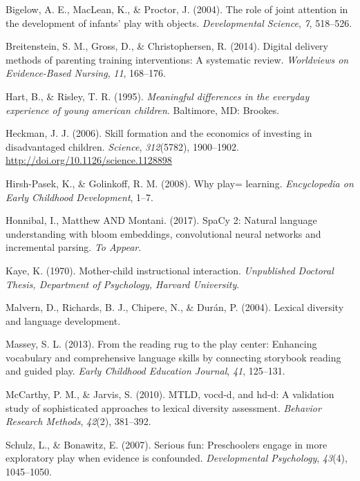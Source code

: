 \documentclass[10pt, letterpaper]{article}
\begin{document}
\hypertarget{ref-Bigelow2004}{}
Bigelow, A. E., MacLean, K., \& Proctor, J. (2004). The role of joint
attention in the development of infants' play with objects.
\emph{Developmental Science}, \emph{7}, 518--526.

\hypertarget{ref-Breitenstein2014}{}
Breitenstein, S. M., Gross, D., \& Christophersen, R. (2014). Digital
delivery methods of parenting training interventions: A systematic
review. \emph{Worldviews on Evidence-Based Nursing}, \emph{11},
168--176.

\hypertarget{ref-Hart1995}{}
Hart, B., \& Risley, T. R. (1995). \emph{Meaningful differences in the
everyday experience of young american children}. Baltimore, MD: Brookes.

\hypertarget{ref-Heckman2006}{}
Heckman, J. J. (2006). Skill formation and the economics of investing in
disadvantaged children. \emph{Science}, \emph{312}(5782), 1900--1902.
\url{http://doi.org/10.1126/science.1128898}

\hypertarget{ref-Hirsh2008}{}
Hirsh-Pasek, K., \& Golinkoff, R. M. (2008). Why play= learning.
\emph{Encyclopedia on Early Childhood Development}, 1--7.

\hypertarget{ref-spacy2}{}
Honnibal, I., Matthew AND Montani. (2017). SpaCy 2: Natural language
understanding with bloom embeddings, convolutional neural networks and
incremental parsing. \emph{To Appear}.

\hypertarget{ref-Kaye1970}{}
Kaye, K. (1970). Mother-child instructional interaction.
\emph{Unpublished Doctoral Thesis, Department of Psychology, Harvard
University}.

\hypertarget{ref-Malvern2004}{}
Malvern, D., Richards, B. J., Chipere, N., \& Durán, P. (2004). Lexical
diversity and language development.

\hypertarget{ref-Massey2013}{}
Massey, S. L. (2013). From the reading rug to the play center: Enhancing
vocabulary and comprehensive language skills by connecting storybook
reading and guided play. \emph{Early Childhood Education Journal},
\emph{41}, 125--131.

\hypertarget{ref-McCarthy2010}{}
McCarthy, P. M., \& Jarvis, S. (2010). MTLD, vocd-d, and hd-d: A
validation study of sophisticated approaches to lexical diversity
assessment. \emph{Behavior Research Methods}, \emph{42}(2), 381--392.

\hypertarget{ref-Schulz2007}{}
Schulz, L., \& Bonawitz, E. (2007). Serious fun: Preschoolers engage in
more exploratory play when evidence is confounded. \emph{Developmental
Psychology}, \emph{43}(4), 1045--1050.
\end{document}
